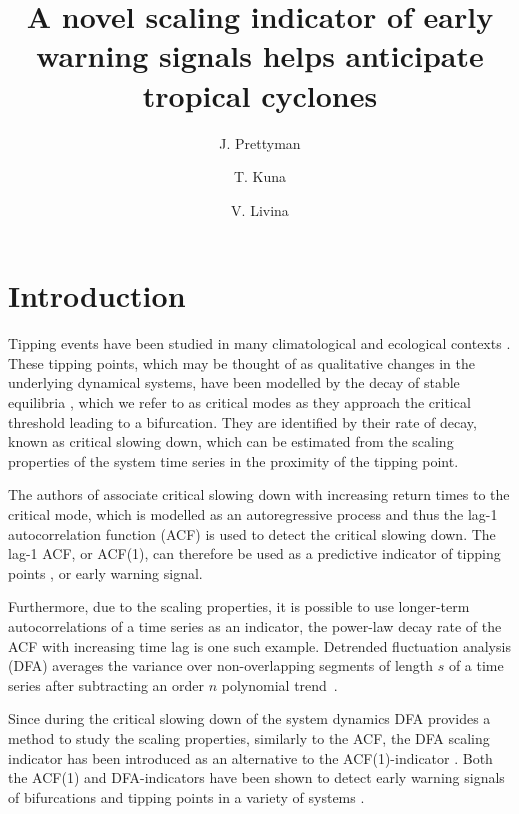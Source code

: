 \documentclass[doublecol]{epl2}
\title{A novel scaling indicator of early warning signals 
helps anticipate tropical cyclones}
\author{J. Prettyman\inst{1,2} \and T. Kuna\inst{1} \and V. Livina\inst{2}}
\institute{                    
  \inst{1} University of Reading, Whiteknights, Reading, RG6 6AX, UK\\
  \inst{2} National Physical Laboratory, Hampton road, 
Teddington, TW11 0LW, UK
}
\begin{document}


\maketitle

\section{Introduction}\label{sec_intro}

Tipping events have been studied in many climatological and 
ecological contexts 
\cite{scheffer2001, livina2011, dakos2012, ashwin2012, gsell2016, 
ditlevsen17}. 
These tipping points, which may be thought of as qualitative 
changes in the underlying dynamical systems, have been modelled 
by the decay of stable equilibria \cite{scheffer2009}, which we 
refer to as critical modes as they approach the critical threshold 
leading to a bifurcation. They are identified by their rate of decay, 
known as critical slowing down, which can be estimated from the 
scaling properties of the system time series in the proximity of the 
tipping point.

The authors of \cite{scheffer2009} associate critical slowing down 
with increasing return times to the critical mode, which is modelled 
as an autoregressive process and thus the lag-1 autocorrelation 
function (ACF) is used to detect the critical slowing down. 
The lag-1 ACF, or ACF(1), can therefore be used as a predictive 
indicator of tipping points \cite{held2004}, or early warning signal.

Furthermore, due to the scaling properties, it is possible to use 
longer-term autocorrelations of a time series as an indicator, 
the power-law decay rate of the ACF with increasing time lag is 
one such example. Detrended fluctuation analysis (DFA) averages 
the variance over non-overlapping segments of length $s$ of a 
time series after subtracting an order $n$ polynomial 
trend~\cite{kantelhardt2001}.

Since during the critical slowing down of the system
dynamics DFA provides a method to study the scaling properties, 
similarly to the ACF, the DFA scaling indicator has been introduced 
as an alternative to the ACF(1)-indicator \cite{livina2007}. 
Both the ACF(1) and DFA-indicators have been shown to detect 
early warning signals of bifurcations and tipping points in a 
variety of systems \cite{dakos2008, lenton2012}.
\end{document}
